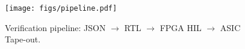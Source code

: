 \begin{figure}[ht]
\centering
\texttt{[image: figs/pipeline.pdf]}
\caption{Verification pipeline: JSON $\rightarrow$ RTL $\rightarrow$ FPGA HIL $\rightarrow$ ASIC Tape-out.}
\label{fig:pipeline}
\end{figure}
